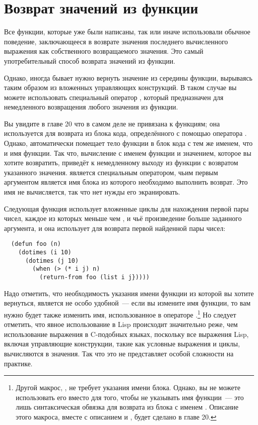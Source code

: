 \section{Возврат значений из функции}

Все функции, которые уже были написаны, так или иначе использовали обычное поведение,
заключающееся в возврате значения последнего вычисленного выражения как собственного
возвращаемого значения.  Это самый употребительный способ возврата значений из функции.

Однако, иногда бывает нужно вернуть значение из середины функции, вырываясь таким образом
из вложенных управляющих конструкций.  В таком случае вы можете использовать специальный
оператор , который предназначен для немедленного возвращения любого
значения из функции.

Вы увидите в главе 20 что  в самом деле не привязана к функциям; она
используется для возврата из блока кода, определённого с помощью оператора .
Однако,  автоматически помещает тело функции в блок кода с тем же именем, что и
имя функции.  Так что, вычисление  с именем функции и значением, которое вы
хотите возвратить, приведёт к немедленному выходу из функции с возвратом указанного
значения.   является специальным оператором, чьим первым аргументом
является имя блока из которого необходимо выполнить возврат.  Это имя не вычисляется, так
что нет нужды его экранировать.

Следующая функция использует вложенные циклы для нахождения первой пары чисел, каждое из
которых меньше чем , и чьё произведение больше заданного аргумента, и она использует
 для возврата первой найденной пары чисел:

\begin{lstlisting}
  (defun foo (n)
    (dotimes (i 10)
      (dotimes (j 10)
        (when (> (* i j) n)
          (return-from foo (list i j}))))
\end{lstlisting}

Надо отметить, что необходимость указания имени функции из которой вы хотите вернуться,
является не особо удобной~--- если вы измените имя функции, то вам нужно будет также
изменить имя, использованное в операторе .\footnote{Другой макрос,
  , не требует указания имени блока.  Однако, вы не можете использовать его
  вместо  для того, чтобы не указывать имя функции~--- это лишь
  синтаксическая обвязка для возврата из блока с именем .  Описание этого
  макроса, вместе с описанием  и , будет сделано в главе
  20.}  Но следует отметить, что явное использование  в Lisp происходит
значительно реже, чем использование выражения  в C-подобных языках, поскольку
все выражения Lisp, включая управляющие конструкции, такие как условные выражения и циклы,
вычисляются в значения.  Так что это не представляет особой сложности на практике.

